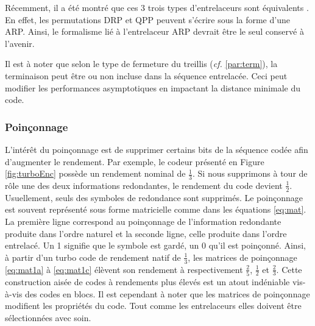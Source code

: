 Récemment, il a été montré que ces 3 trois types d'entrelaceurs sont équivalents \cite{EquivalenceInt}. En effet, les 
permutations DRP et QPP peuvent s'écrire sous la forme d'une ARP. Ainsi, le formalisme lié à l'entrelaceur ARP devrait 
être le seul conservé à l'avenir.

Il est à noter que selon le type de fermeture du treillis ({\it cf.} \ref{par:term}), la terminaison peut être ou non 
incluse dans la séquence entrelacée. Ceci peut modifier les performances asymptotiques en impactant la distance minimale 
du code.

\subsubsection{Poinçonnage}
L'intérêt du poinçonnage est de supprimer certains bits de la séquence codée afin d'augmenter le rendement. Par exemple, 
le codeur présenté en Figure \ref{fig:turboEnc} possède un rendement nominal de $\frac{1}{3}$. Si nous supprimons à tour 
de rôle une des deux informations redondantes, le rendement du code devient $\frac{1}{2}$. Usuellement, seuls des symboles 
de redondance sont supprimés. Le poinçonnage est souvent représenté sous forme matricielle comme dans les équations \ref{eq:mat}. 
La première ligne correspond au poinçonnage de l'information redondante produite dans l'ordre naturel et la seconde ligne, 
celle produite dans l'ordre entrelacé. Un 1 signifie que le symbole est gardé, un 0 qu'il est poinçonné. Ainsi, à partir 
d'un turbo code de rendement natif de $\frac{1}{3}$, les matrices de poinçonnage \ref{eq:mat1a} à \ref{eq:mat1c} élèvent 
son rendement à respectivement  $\frac{2}{5}$, $\frac{1}{2}$ et $\frac{2}{3}$. Cette construction aisée de codes à 
rendements plus élevés est un atout indéniable vis-à-vis des codes en blocs. Il est cependant à noter que les matrices 
de poinçonnage modifient les propriétés du code. Tout comme les entrelaceurs elles doivent être sélectionnées avec soin.\vspace*{-1em}

